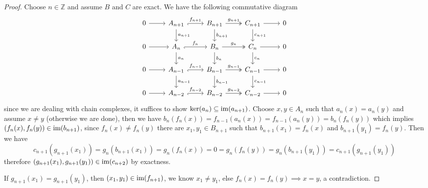 \begin{proof}[Proof]
    Choose $n\in\mathbb{Z}$ and assume $B$ and $C$ are exact. We 
    have the following commutative diagram
    \[\begin{tikzcd}
        0 & {A_{n+1}} & {B_{n+1}} & {C_{n+1}} & 0 \\
        0 & {A_n} & {B_n} & {C_n} & 0 \\
        0 & {A_{n-1}} & {B_{n-1}} & {C_{n-1}} & 0 \\
        0 & {A_{n-2}} & {B_{n-2}} & {C_{n-2}} & 0
        \arrow[from=1-1, to=1-2]
        \arrow["{{{f_{n+1}}}}", hook', from=1-2, to=1-3]
        \arrow["{{{a_{n+1}}}}", from=1-2, to=2-2]
        \arrow["{{{g_{n+1}}}}", two heads, from=1-3, to=1-4]
        \arrow["{{{b_{n+1}}}}", from=1-3, to=2-3]
        \arrow[from=1-4, to=1-5]
        \arrow["{{{c_{n+1}}}}", from=1-4, to=2-4]
        \arrow[from=2-1, to=2-2]
        \arrow["{{{f_n}}}", hook', from=2-2, to=2-3]
        \arrow["{{{a_n}}}", from=2-2, to=3-2]
        \arrow["{{{g_n}}}", two heads, from=2-3, to=2-4]
        \arrow["{{{b_n}}}", from=2-3, to=3-3]
        \arrow[from=2-4, to=2-5]
        \arrow["{{{c_{n}}}}", from=2-4, to=3-4]
        \arrow[from=3-1, to=3-2]
        \arrow["{{{f_{n-1}}}}", hook', from=3-2, to=3-3]
        \arrow["{a_{n-1}}", from=3-2, to=4-2]
        \arrow["{{{g_{n-1}}}}", two heads, from=3-3, to=3-4]
        \arrow["{b_{n-1}}", from=3-3, to=4-3]
        \arrow[from=3-4, to=3-5]
        \arrow["{c_{n-1}}", from=3-4, to=4-4]
        \arrow[from=4-1, to=4-2]
        \arrow["{f_{n-2}}", hook', from=4-2, to=4-3]
        \arrow["{g_{n-2}}", two heads, from=4-3, to=4-4]
        \arrow[from=4-4, to=4-5]
    \end{tikzcd}\]
    since we are dealing with chain complexes, it suffices to show $\ker(a_n)\subseteq\text{im}(a_{n+1})$.
    Choose $x,y\in A_n$ such that $a_n(x)=a_n(y)$ and assume $x\neq y$ (otherwise we are done), then we have
    $b_n(f_n(x))=f_{n-1}(a_n(x))=f_{n-1}(a_n(y))=b_n(f_n(y))$ which implies 
    $(f_n(x),f_n(y))\in\text{im}(b_{n+1})$, since $f_n(x)\neq f_n(y)$ there are 
    $x_1,y_1\in B_{n+1}$ such that $b_{n+1}(x_1)=f_n(x)$ and $b_{n+1}(y_1)=f_n(y)$.
    Then we have 
    \[
    c_{n+1}(g_{n+1}(x_1))=g_n(b_{n+1}(x_1))=g_n(f_n(x))=0=g_n(f_n(y))= g_n(b_{n+1}(y_1))=c_{n+1}(g_{n+1}(y_1))
    \]
    therefore $(g_{n+1}(x_1),g_{n+1}(y_1))\in\text{im}(c_{n+2})$ by exactness.\par
    If $g_{n+1}(x_1)=g_{n+1}(y_1)$, then $(x_1,y_1)\in\text{im}(f_{n+1})$, we know
    $x_1\neq y_1$, else $f_n(x)=f_n(y) \implies x=y$, a contradiction.

\end{proof}
